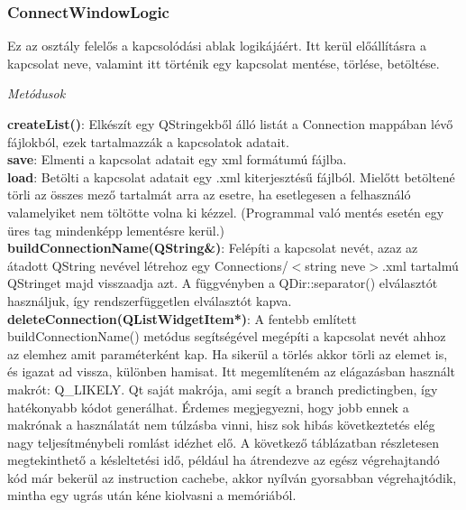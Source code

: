 \subsubsection{ConnectWindowLogic}

Ez az osztály felelős a kapcsolódási ablak logikájáért. Itt kerül előállításra a kapcsolat neve, valamint itt történik egy kapcsolat mentése, törlése, betöltése.

\begin{flushleft}
\textit{Metódusok}
\end{flushleft}
\textbf{createList()}: Elkészít egy QStringekből álló listát a Connection mappában lévő fájlokból, ezek tartalmazzák a kapcsolatok adatait. \\
\textbf{save}: Elmenti a kapcsolat adatait egy xml formátumú fájlba. \\
\textbf{load}: Betölti a kapcsolat adatait egy .xml kiterjesztésű fájlból. Mielőtt betöltené
törli az összes mező tartalmát arra az esetre, ha esetlegesen a felhasználó valamelyiket nem
töltötte volna ki kézzel. (Programmal való mentés esetén egy üres tag mindenképp lementésre
kerül.) \\
\textbf{buildConnectionName(QString\&)}: Felépíti a kapcsolat nevét, azaz az átadott QString nevével létrehoz egy
Connections/$<$string neve$>$.xml tartalmú QStringet majd visszaadja azt. A függvényben a QDir::separator() elválasztót
használjuk, így rendszerfüggetlen elválasztót kapva. \\
\textbf{deleteConnection(QListWidgetItem*)}: A fentebb említett buildConnectionName() metódus segítségével megépíti a kapcsolat nevét
ahhoz az elemhez amit paraméterként kap. Ha sikerül a törlés akkor törli az elemet is, és igazat ad vissza, különben hamisat.
Itt megemlíteném az elágazásban használt makrót: Q\_LIKELY. Qt saját makrója, ami segít a branch predictingben, így
hatékonyabb kódot generálhat. Érdemes megjegyezni, hogy jobb ennek a makrónak a használatát nem
túlzásba vinni, hisz sok hibás következtetés elég nagy teljesítménybeli romlást idézhet elő. A következő táblázatban részletesen
megtekinthető a késleltetési idő, például ha átrendezve az egész végrehajtandó kód már bekerül az instruction cachebe, akkor nyílván
gyorsabban végrehajtódik, mintha egy ugrás után kéne kiolvasni a memóriából.

